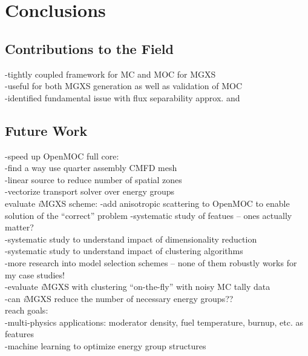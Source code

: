 \documentclass[12pt,twoside]{mitthesis-exec}
\begin{document}
\clearpage

\section*{Conclusions}

\subsection*{Contributions to the Field}

-tightly coupled framework for MC and MOC for MGXS \\
-useful for both MGXS generation as well as validation of MOC \\
-identified fundamental issue with flux separability approx. and 

\subsection*{Future Work}

-speed up OpenMOC full core: \\
  -find a way use quarter assembly CMFD mesh \\
  -linear source to reduce number of spatial zones \\
  -vectorize transport solver over energy groups \\

evaluate \textit{i}MGXS scheme:
-add anisotropic scattering to OpenMOC to enable solution of the ``correct'' problem
-systematic study of featues -- ones actually matter? \\
-systematic study to understand impact of dimensionality reduction \\
-systematic study to understand impact of clustering algorithms \\
-more research into model selection schemes -- none of them robustly works for my case studies! \\
-evaluate \textit{i}MGXS with clustering ``on-the-fly'' with noisy MC tally data \\
-can \textit{i}MGXS reduce the number of necessary energy groups?? \\

reach goals:\\
-multi-physics applications: moderator density, fuel temperature, burnup, etc. as features \\
-machine learning to optimize energy group structures \\



\begin{singlespace}


\end{singlespace}
\end{document}
